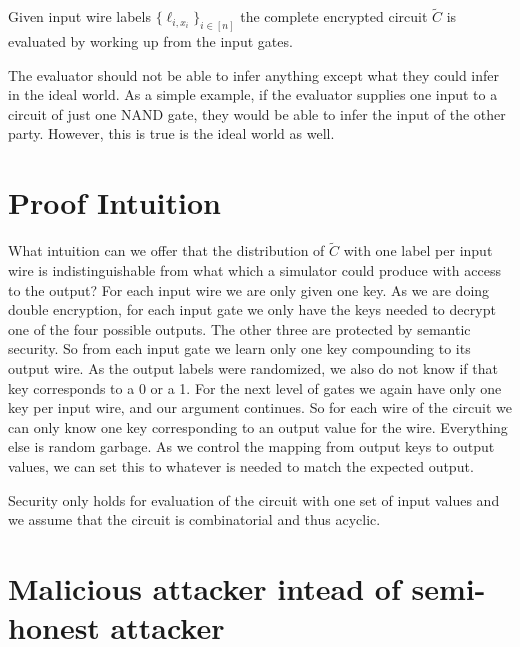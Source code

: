 Given input wire labels 
$\{ \ell_{i, x_i} \}_{i \in [n]}$
the complete encrypted circuit $\tilde{C}$ is evaluated by working up from the input gates. 




The evaluator should not be able to infer anything except what they could infer in the ideal world.
As a simple example, if the evaluator supplies one input to a circuit of just one NAND gate,
 they would be able to infer the input of the other party. However, this is true is the ideal world as well.

\section{Proof Intuition}

What intuition can we offer that the 
distribution of $\tilde{C}$ with one label per input wire 
is indistinguishable from what which a simulator could produce with access to the output?
%
For each input wire we are only given one key.
As we are doing double encryption,
for each input gate we only have the keys needed to decrypt one of the four possible outputs.
The other three are protected by semantic security.
%
So from each input gate we learn only one key compounding to its output wire.
As the output labels were randomized, we also do not know if that key corresponds to a 0 or a 1. 
%
For the next level of gates we again have only one key per input wire, and our argument continues. 
%
 So for each wire of the circuit we can only know one key corresponding to an output value for the wire. 
 Everything else is random garbage.
% 
As we control the mapping from output keys to output values, we can set this to whatever is needed to
match the expected output. 


Security only holds for evaluation of the circuit with one set of input values and 
we assume that the circuit is combinatorial and thus acyclic. 






\section{Malicious attacker intead of semi-honest attacker}

